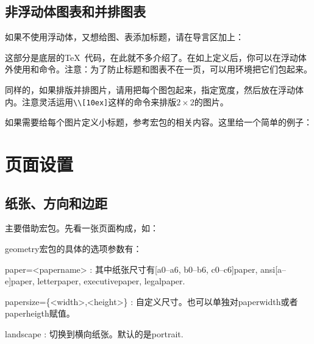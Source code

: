 \subsection{非浮动体图表和并排图表}
如果不使用浮动体，又想给图、表添加标题，请在导言区加上：
\begin{latex}
\makeatletter
\newcommand\figcaption{\def\@captype{figure}\caption}
\newcommand\tabcaption{\def\@captype{table}\caption}
\makeatother
\end{latex}

这部分是底层的\TeX\ 代码，在此就不多介绍了。在如上定义后，你可以在浮动体外使用和命令。注意：为了防止标题和图表不在一页，可以用环境把它们包起来。

同样的，如果排版并排图片，请用把每个图包起来，指定宽度，然后放在浮动体内。注意灵活运用\verb|\\[10ex]|这样的命令来排版$2\times 2$的图片。

如果需要给每个图片定义小标题，参考宏包的相关内容。这里给一个简单的例子：
\begin{latex}
\begin{figure}
\centering
\subfloat[...]{\label{sub-fig-1}
    \begin{minipage}
    \centering
    \texttt{[image: ...]}
    \end{minipage}}
\quad\subfloat[...]
\end{latex}

\section{页面设置}
\label{sec:geometry}
\subsection{纸张、方向和边距}
主要借助宏包。先看一张页面构成，如：
\begin{figure}
\centering

\label{fig:geo-paper}
\end{figure}

geometry宏包的具体的选项参数有：
\begin{para}
\item[paper=<papername>]: 其中纸张尺寸有[a0--a6, b0--b6, c0--c6]paper, ansi[a--e]paper, letterpaper, executivepaper, legalpaper.
\item[papersize=\{<width>,<height>\}]: 自定义尺寸。也可以单独对paperwidth或者paperheigth赋值。
\item[landscape]: 切换到横向纸张。默认的是portrait.
\end{para}

